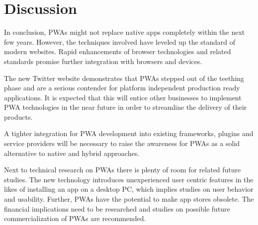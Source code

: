 \chapter{Discussion}

In conclusion, PWAs might not replace native apps completely within the next few years. However, the techniques involved have leveled up the standard of modern websites. Rapid enhancements of browser technologies and related standards promise further integration with browsers and devices.

The new Twitter website demonstrates that PWAs stepped out of the teething phase and are a serious contender for platform independent production ready applications. It is expected that this will entice other businesses to implement PWA technologies in the near future in order to streamline the delivery of their products.

A tighter integration for PWA development into existing frameworks, plugins and service providers will be necessary to raise the awareness for PWAs as a solid alternative to native and hybrid approaches.

Next to technical research on PWAs there is plenty of room for related future studies. The new technology introduces unexperienced user centric features in the likes of installing an app on a desktop PC, which implies studies on user behavior and usability. Further, PWAs have the potential to make app stores obsolete. The financial implications need to be researched and studies on possible future commercialization of PWAs are recommended.
